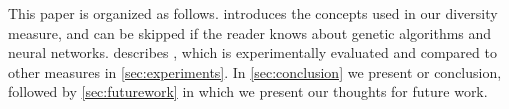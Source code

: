 This paper is organized as follows.  introduces the concepts used in our diversity measure, and can be skipped if the reader knows about genetic algorithms and neural networks.  describes \dia{}, which is experimentally evaluated and compared to other measures in \cref{sec:experiments}. In \cref{sec:conclusion} we present or conclusion, followed by \cref{sec:futurework} in which we present our thoughts for future work.

